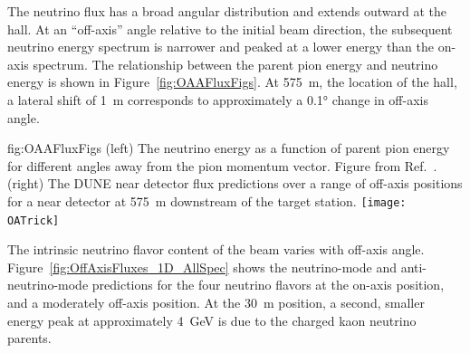The neutrino flux has a broad angular distribution and extends outward at the  hall. At an ``off-axis'' angle relative to the initial beam direction, the subsequent neutrino energy spectrum is narrower and peaked at a lower energy than the on-axis spectrum.
The relationship between the parent pion energy and neutrino energy is shown in Figure~\ref{fig:OAAFluxFigs}.  At \SI{575}{m}, the location of the  hall, a lateral shift of \SI{1}{m} corresponds to approximately a \ang{0.1} change in off-axis angle.

\begin{dunefigure}{fig:OAAFluxFigs}
{(left) The neutrino energy as a function of parent pion energy for different angles away from the pion momentum vector. Figure from Ref.~\cite{Duffy:2016owt}. (right) The DUNE near detector flux predictions over a range of off-axis positions for a near detector at \SI{575}{m} downstream of the target station. }
    \texttt{[image: OATrick]}
\end{dunefigure}

The intrinsic neutrino flavor content of the beam varies with off-axis angle. Figure~\ref{fig:OffAxisFluxes_1D_AllSpec} shows the neutrino-mode and anti-neutrino-mode predictions for the four neutrino flavors at the on-axis position, and a moderately off-axis position. At the \SI{30}{m} position, a second, smaller energy peak at approximately \SI{4}{\GeV} is due to the charged kaon neutrino parents. 

